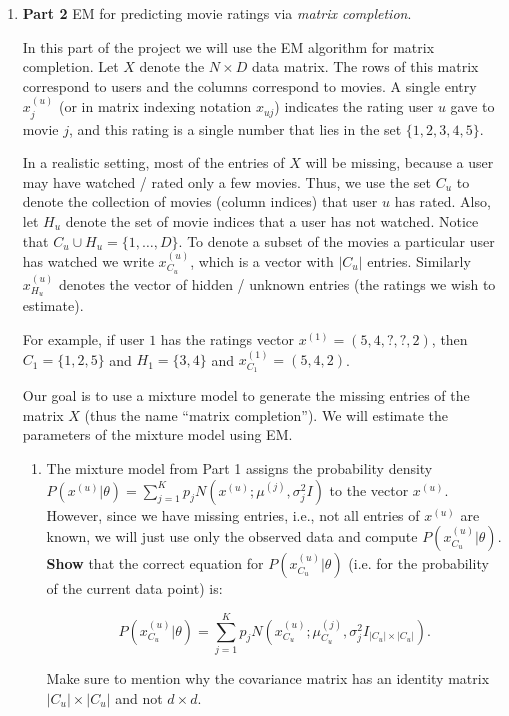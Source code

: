 \begin{enumerate}
\item {\bf Part 2} EM for predicting movie ratings via \emph{matrix completion}.

In this part of the project we will use the EM algorithm for matrix completion. Let $X$ denote the $N \times D$ data matrix. The rows of this matrix correspond to users and the columns correspond to movies. A single entry $x^{(u)}_{j}$ (or in matrix indexing notation $x_{uj}$) indicates the rating user $u$ gave to movie $j$, and this rating is a single number that lies in the set $\{1,2,3,4,5\}$.

In a realistic setting, most of the entries of $X$ will be missing, because a user may have watched / rated only a few movies. Thus, we use the set $C_{u}$ to denote the collection of movies (column indices) that user $u$ has rated. Also, let $H_{u}$ denote the set of movie indices that a user has not watched. Notice that $C_{u} \cup H_{u} = \{1,\ldots,D\}$. To denote a subset of the movies a particular user has watched we write $x_{C_u}^{(u)}$, which is a vector with $|C_u|$ entries. Similarly $x_{H_u}^{(u)}$ denotes the vector of hidden / unknown entries (the ratings we wish to estimate).

For example, if user $1$ has the ratings vector $x^{(1)} =  (5, 4, ?, ?, 2)$, then $C_{1} = \{1, 2, 5\}$ and $H_{1} = \{ 3, 4\}$ and $x^{(1)}_{C_1} = (5, 4, 2)$.

Our goal is to use a mixture model to generate the missing entries of the matrix $X$ (thus the name ``matrix completion''). We will estimate the parameters of the mixture model using EM.

\begin{enumerate}
\item The mixture model from Part 1 assigns the probability density $P(x^{(u)} | \theta) = \sum^{K}_{j=1} p_j N(x^{(u)}; \mu^{(j)}, \sigma^2_j I)$ to the vector $x^{(u)}$. However, since we have missing entries, i.e., not all entries of $x^{(u)}$ are known, we will just use only the observed data and compute $P(x^{(u)}_{C_u} | \theta)$. \textbf{Show} that the correct equation for $P(x^{(u)}_{C_u}  | \theta)$ (i.e. for the probability of the current data point) is:

 $$P(x^{(u)}_{C_u}  | \theta) = \sum^{K}_{j=1} p_j N(x^{(u)}_{C_u} ; \mu^{(j)}_{C_u} , \sigma^2_j I_{|C_u| \times |C_u|}).$$

Make sure to mention why the covariance matrix has an identity matrix $ |C_u| \times |C_u| $ and not $ d \times d $.


\end{enumerate}
\end{enumerate}
